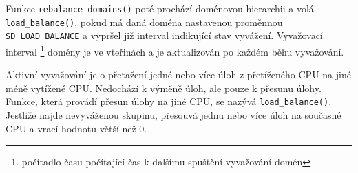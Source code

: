 \documentclass[
  master=true,
  font=sans,
  printversion=false,
  joinlists=true,
  figures=true,
  tables=true,
  sourcecodes=false,
  theorems=false,
  bibencoding=utf8,
  language=czech,
  encoding=utf8,
  field=ainfk,
  biblatex,
  glossaries,
  index
]{kidiplom}
\begin{document}
Funkce \verb#rebalance_domains()# poté prochází doménovou hierarchii a volá \verb#load_balance()#, pokud má daná doména nastavenou proměnnou \linebreak \verb#SD_LOAD_BALANCE# a vypršel již interval indikující stav vyvážení. Vyvažovací interval \footnote{počítadlo času počítající čas k dalšímu spuštění vyvažování domén} domény je ve vteřinách a je aktualizován po každém běhu vyvažování.

Aktivní vyvažování je o přetažení jedné nebo více úloh z přetíženého CPU na jiné méně vytížené CPU. Nedochází k výměně úloh, ale pouze k přesunu úlohy. Funkce, která provádí přesun úlohy na jiné CPU, se nazývá \verb#load_balance()#. Jestliže najde nevyváženou skupinu, přesouvá jednu nebo více úloh na současné CPU a vrací hodnotu větší než 0.

%
%
%
%
%
%
%
%
%
%
%
%
%
%
%
%
%
\end{document}

